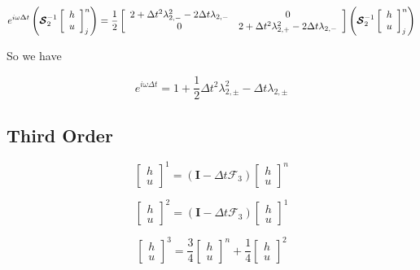 \documentclass[12pt]{article}
\begin{document}
\[e^{i\omega\Delta t}\left(\boldsymbol{\mathcal{S}}_2^{-1}\left[\begin{array}{c}
h \\ u
\end{array}\right]^{n}_j \right) = \frac{1}{2}\left[\begin{array}{c c}
2 + \Delta t^2 \lambda_{2,-}^2  -2\Delta t\lambda_{2,-}  & 0 \\0  & 2 + \Delta t^2 \lambda_{2,+}^2 -2\Delta t\lambda_{2,-}
\end{array}\right]  \left(\boldsymbol{\mathcal{S}}_2^{-1}\left[\begin{array}{c}
h \\ u
\end{array}\right]^{n}_j \right)  \]

So we have

\[e^{i\omega\Delta t} = 1 + \frac{1}{2}\Delta t^2 \lambda_{2,\pm}^2  -\Delta t\lambda_{2,\pm}\]



\subsection{Third Order}

\[\left[\begin{array}{c}
h \\ u
\end{array}\right]^{1} = (\boldsymbol{I} - \Delta t\boldsymbol{\mathcal{F}}_3 )\left[\begin{array}{c}
h \\ u
\end{array}\right]^n\]

\[\left[\begin{array}{c}
h \\ u
\end{array}\right]^{2} = (\boldsymbol{I} - \Delta t\boldsymbol{\mathcal{F}}_3 )\left[\begin{array}{c}
h \\ u
\end{array}\right]^1\]

\[\left[\begin{array}{c}
h \\ u
\end{array}\right]^{3} = \frac{3}{4}\left[\begin{array}{c}
h \\ u
\end{array}\right]^n +  \frac{1}{4}\left[\begin{array}{c}
h \\ u
\end{array}\right]^2\]
\end{document}
